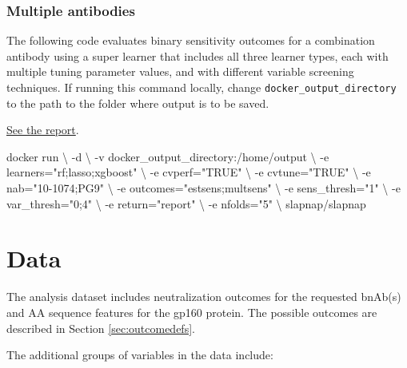 \documentclass[
]{article}
\newenvironment{Shaded}{\begin{snugshade}}{\end{snugshade}}
\newcommand{\ExtensionTok}[1]{#1}
\newcommand{\NormalTok}[1]{#1}
\newcommand{\StringTok}[1]{\textcolor[rgb]{0.31,0.60,0.02}{#1}}
\begin{document}
\hypertarget{multiple-antibodies}{%
\subsubsection{Multiple antibodies}\label{multiple-antibodies}}

The following code evaluates binary sensitivity outcomes for a combination antibody using a super learner that includes all three learner types, each with multiple tuning parameter values, and with different variable screening techniques. If running this command locally, change \texttt{docker\_output\_directory} to the path to the folder where output is to be saved.

\href{reports/report_10-1074_pg9.html}{See the report}.

\begin{Shaded}
\begin{Highlighting}[]
\ExtensionTok{docker}\NormalTok{ run \textbackslash{}}
\NormalTok{  {-}d \textbackslash{}}
\NormalTok{  {-}v docker\_output\_directory:/home/output \textbackslash{}}
\NormalTok{  {-}e learners=}\StringTok{"rf;lasso;xgboost"}\NormalTok{ \textbackslash{}}
\NormalTok{  {-}e cvperf=}\StringTok{"TRUE"}\NormalTok{ \textbackslash{}}
\NormalTok{  {-}e cvtune=}\StringTok{"TRUE"}\NormalTok{ \textbackslash{}}
\NormalTok{  {-}e nab=}\StringTok{"10{-}1074;PG9"}\NormalTok{ \textbackslash{}}
\NormalTok{  {-}e outcomes=}\StringTok{"estsens;multsens"}\NormalTok{ \textbackslash{}}
\NormalTok{  {-}e sens\_thresh=}\StringTok{"1"}\NormalTok{ \textbackslash{}}
\NormalTok{  {-}e var\_thresh=}\StringTok{"0;4"}\NormalTok{ \textbackslash{}}
\NormalTok{  {-}e return=}\StringTok{"report"}\NormalTok{ \textbackslash{}}
\NormalTok{  {-}e nfolds=}\StringTok{"5"}\NormalTok{ \textbackslash{}}
\NormalTok{  slapnap/slapnap}
\end{Highlighting}
\end{Shaded}

\hypertarget{sec:data}{%
\section{Data}\label{sec:data}}

The analysis dataset includes neutralization outcomes for the requested bnAb(s) and AA sequence features for the gp160 protein. The possible outcomes are described in Section \ref{sec:outcomedefs}.

The additional groups of variables in the data include:
\end{document}
